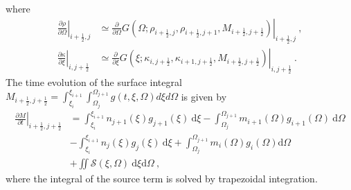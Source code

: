 where 
\begin{equation}
    \begin{aligned}
    \left.\frac{\partial \rho}{\partial \Omega}\right|_{i+\frac{1}{2},j}
    &\simeq \left.\frac{\partial}{\partial \Omega} G(\Omega;\rho_{i+\frac{1}{2},j},\rho_{i+\frac{1}{2},j+1}, M_{i+\frac{1}{2},j+\frac{1}{2}})\right|_{i+\frac{1}{2},j}~, \\
    \left.\frac{\partial \kappa}{\partial \xi}\right|_{i,j+\frac{1}{2}}
 &\simeq \left.\frac{\partial}{\partial \xi} G(\xi;\kappa_{i,j+\frac{1}{2}},\kappa_{i+1,j+\frac{1}{2}}, M_{i+\frac{1}{2},j+\frac{1}{2}})\right|_{i,j+\frac{1}{2}}~.
    \end{aligned}
\end{equation} 
The time evolution of the surface integral $M_{i+\frac{1}{2},j+\frac{1}{2}}=\int_{\xi_i}^{\xi_{i+1}}\int_{\Omega_j}^{\Omega_{j+1}}g(t,\xi,\Omega)d\xi d\Omega$
is given by \cite{imadera2009}
\begin{equation}\label{eq.area}
    \begin{aligned}
         \left.\frac{\partial M}{\partial t}\right|_{i+\frac{1}{2},j+\frac{1}{2}}
         &= \int_{\xi_i}^{\xi_{i+1}} n_{j+1}(\xi) g_{j+1}(\xi)~\mathrm{d}\xi - \int_{\Omega_j}^{\Omega_{j+1}} m_{i+1}(\Omega) g_{i+1} (\Omega)~\mathrm{d} \Omega \\
        & - \int_{\xi_i}^{\xi_{i+1}} n_{j}(\xi) g_{j}(\xi)~\mathrm{d}\xi + \int_{\Omega_j}^{\Omega_{j+1}} m_{i}(\Omega) g_{i} (\Omega) \mathrm{d}\Omega \\
        &+ \iint \mathcal{S}(\xi,\Omega)~\mathrm{d}\xi\mathrm{d}\Omega~,
    \end{aligned}
\end{equation}
where the integral of the source term is solved by trapezoidal integration.


